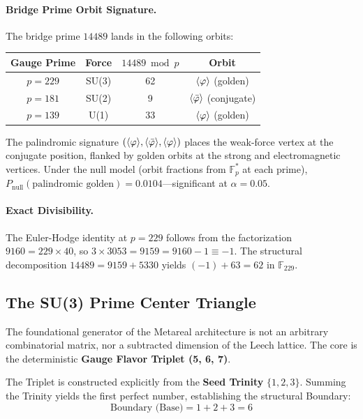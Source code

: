 \paragraph{Bridge Prime Orbit Signature.}
The bridge prime $14489$ lands in the following orbits:
\begin{center}
\begin{tabular}{@{}cccc@{}}
\toprule
\textbf{Gauge Prime} & \textbf{Force} & $14489 \bmod p$ & \textbf{Orbit} \\
\midrule
$p = 229$ & SU(3) & 62 & $\langle\varphi\rangle$ (golden) \\
$p = 181$ & SU(2) & 9 & $\langle\bar{\varphi}\rangle$ (conjugate) \\
$p = 139$ & U(1) & 33 & $\langle\varphi\rangle$ (golden) \\
\bottomrule
\end{tabular}
\end{center}
The palindromic signature $(\langle\varphi\rangle, \langle\bar{\varphi}\rangle, \langle\varphi\rangle)$ places the weak-force vertex at the conjugate position, flanked by golden orbits at the strong and electromagnetic vertices. Under the null model (orbit fractions from $\mathbb{F}_p^*$ at each prime), $P_{\text{null}}(\text{palindromic golden}) = 0.0104$---significant at $\alpha = 0.05$.

\paragraph{Exact Divisibility.}
The Euler-Hodge identity at $p = 229$ follows from the factorization $9160 = 229 \times 40$, so $3 \times 3053 = 9159 = 9160 - 1 \equiv -1$. The structural decomposition $14489 = 9159 + 5330$ yields $(-1) + 63 = 62$ in $\mathbb{F}_{229}$.


\subsection{The SU(3) Prime Center Triangle}

The foundational generator of the Metareal architecture is not an arbitrary combinatorial matrix, nor a subtracted dimension of the Leech lattice. The core is the deterministic \textbf{Gauge Flavor Triplet (5, 6, 7)}. 

The Triplet is constructed explicitly from the \textbf{Seed Trinity} $\{1, 2, 3\}$. Summing the Trinity yields the first perfect number, establishing the structural Boundary:
\begin{equation}
    \text{Boundary (Base)} = 1 + 2 + 3 = 6
\end{equation}

